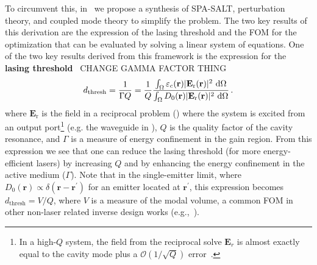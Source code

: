 To circumvent this, in~\cite{ownpub4} we propose a synthesis of SPA-SALT, perturbation theory, and coupled mode theory to simplify the problem. 
The two key results of this derivation are the expression of the lasing threshold and the FOM for the optimization that can be evaluated by solving a linear system of equations.
One of the two key results derived from this framework is the expression for the \textbf{lasing threshold}~\cite{ownpub4} CHANGE GAMMA FACTOR THING
\begin{equation}\label{eq:pump_thresh}
    d_\text{thresh} = \frac{1}{\Gamma Q} = \frac{1}{Q} \frac{\int_{\Omega} \varepsilon_c(\mathbf{r})|\mathbf{E}_{\text{r}}(\mathbf{r})|^2\,  \mathop{}\!\text{d} \Omega}{\int_{\Omega} D_0(\mathbf{r}) |\mathbf{E}_{\text{r}}(\mathbf{r})|^2\,  \mathop{}\!\text{d} \Omega}\,.
\end{equation}
where $\mathbf{E}_\text{r}$ is the field in a reciprocal problem () where the system is excited from an output port\footnote{In a high-$Q$ system, the field from the reciprocal solve $\mathbf{E}_r$ is almost exactly equal to the cavity mode plus a $\mathcal{O}(1/\sqrt{Q})$ error~\cite{phot_crys}.} (e.g. the waveguide in ), $Q$ is the quality factor of the cavity resonance, and $\Gamma$ is a measure 
of energy confinement in the gain region. From this expression we see that one can reduce the lasing threshold (for more energy-efficient lasers) by increasing $Q$ and by enhancing the energy confinement in the
active medium ($\Gamma$). Note that in the single-emitter limit, where $D_0(\mathbf{r})\propto \delta (\mathbf{r}-\mathbf{r^\prime})$ for an emitter located at $\mathbf{r}^\prime$, this expression becomes $d_\text{thresh}=V/Q$, where $V$ is a measure
of the modal volume, a common FOM in other non-laser related inverse design works (e.g.,~\cite{LDOS_opt_wang}).

